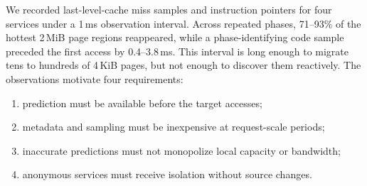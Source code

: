 We recorded last-level-cache miss samples and instruction pointers for four
services under a 1\,ms observation interval.  Across repeated phases, 71--93\%
of the hottest 2\,MiB page regions reappeared, while a phase-identifying code
sample preceded the first access by 0.4--3.8\,ms.  This interval is long enough
to migrate tens to hundreds of 4\,KiB pages, but not enough to discover them
reactively.  The observations motivate four requirements:

\begin{enumerate}
  \item prediction must be available before the target accesses;
  \item metadata and sampling must be inexpensive at request-scale periods;
  \item inaccurate predictions must not monopolize local capacity or bandwidth;
  \item anonymous services must receive isolation without source changes.
\end{enumerate}
